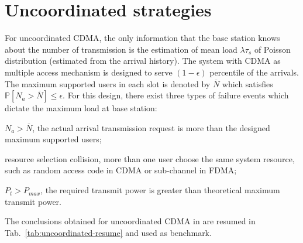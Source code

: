 \section{Uncoordinated strategies}
\label{sec:uncoordinated-strategy}
For uncoordinated CDMA, the only information that the base station knows about the number of transmission is the estimation of mean load $\lambda\tau_s$ of Poisson distribution (estimated from the arrival history). The system with CDMA as multiple access mechanism is designed to serve $(1-\epsilon)$ percentile of the arrivals. The maximum supported users in each slot is denoted by $\overline{N}$ which satisfies $\mathbb{P}\left[N_a > \overline{N}\right] \leq \epsilon$. For this design, there exist three types of failure events which dictate the maximum load at base station:
\begin{inparaenum}[i)]
	\item $N_a > \overline{N}$, the actual arrival transmission request is more than the designed maximum supported users;
	\item resource selection collision, more than one user choose the same system resource, such as random access code in CDMA or sub-channel in FDMA;
	\item $P_t > P_{max}$, the required transmit power is greater than theoretical maximum transmit power. 
\end{inparaenum}
The conclusions obtained for uncoordinated CDMA in \cite{Dhi13} are resumed in Tab.~\ref{tab:uncoordinated-resume} and used as benchmark.
